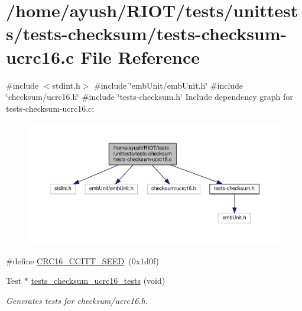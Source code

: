 \hypertarget{tests-checksum-ucrc16_8c}{}\section{/home/ayush/\+R\+I\+O\+T/tests/unittests/tests-\/checksum/tests-\/checksum-\/ucrc16.c File Reference}
\label{tests-checksum-ucrc16_8c}
{\ttfamily \#include $<$stdint.\+h$>$}\newline
{\ttfamily \#include \char`\"{}emb\+Unit/emb\+Unit.\+h\char`\"{}}\newline
{\ttfamily \#include \char`\"{}checksum/ucrc16.\+h\char`\"{}}\newline
{\ttfamily \#include \char`\"{}tests-\/checksum.\+h\char`\"{}}\newline
Include dependency graph for tests-\/checksum-\/ucrc16.c\+:
\nopagebreak
\begin{figure}[H]
\begin{center}
\leavevmode
\includegraphics[width=350pt]{tests-checksum-ucrc16_8c__incl}
\end{center}
\end{figure}
\begin{DoxyCompactItemize}
\item 
\#define \hyperlink{tests-checksum-ucrc16_8c_aa6107563e8227835402d47fc922ab81e}{C\+R\+C16\+\_\+\+C\+C\+I\+T\+T\+\_\+\+S\+E\+ED}~(0x1d0f)
\item 
Test $\ast$ \hyperlink{group__unittests_gab30c0b0af5fcf4297ab2f8321a2838da}{tests\+\_\+checksum\+\_\+ucrc16\+\_\+tests} (void)
\begin{DoxyCompactList}\small\item\em Generates tests for checksum/ucrc16.\+h. \end{DoxyCompactList}\end{DoxyCompactItemize}


